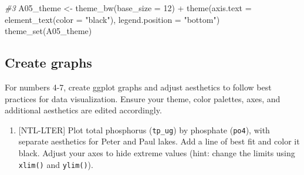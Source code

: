\documentclass[
]{article}
\newenvironment{Shaded}{\begin{snugshade}}{\end{snugshade}}
\newcommand{\AttributeTok}[1]{\textcolor[rgb]{0.77,0.63,0.00}{#1}}
\newcommand{\CommentTok}[1]{\textcolor[rgb]{0.56,0.35,0.01}{\textit{#1}}}
\newcommand{\DecValTok}[1]{\textcolor[rgb]{0.00,0.00,0.81}{#1}}
\newcommand{\FunctionTok}[1]{\textcolor[rgb]{0.00,0.00,0.00}{#1}}
\newcommand{\NormalTok}[1]{#1}
\newcommand{\OtherTok}[1]{\textcolor[rgb]{0.56,0.35,0.01}{#1}}
\newcommand{\SpecialCharTok}[1]{\textcolor[rgb]{0.00,0.00,0.00}{#1}}
\newcommand{\StringTok}[1]{\textcolor[rgb]{0.31,0.60,0.02}{#1}}
\providecommand{\tightlist}{%
  \setlength{\itemsep}{0pt}\setlength{\parskip}{0pt}}
\begin{document}
\begin{Shaded}
\begin{Highlighting}[]
\CommentTok{\#3}
\NormalTok{A05\_theme }\OtherTok{\textless{}{-}} \FunctionTok{theme\_bw}\NormalTok{(}\AttributeTok{base\_size =} \DecValTok{12}\NormalTok{) }\SpecialCharTok{+}
  \FunctionTok{theme}\NormalTok{(}\AttributeTok{axis.text =} \FunctionTok{element\_text}\NormalTok{(}\AttributeTok{color =} \StringTok{"black"}\NormalTok{), }\AttributeTok{legend.position =} \StringTok{"bottom"}\NormalTok{)}
\FunctionTok{theme\_set}\NormalTok{(A05\_theme)}
\end{Highlighting}
\end{Shaded}

\hypertarget{create-graphs}{%
\subsection{Create graphs}\label{create-graphs}}

For numbers 4-7, create ggplot graphs and adjust aesthetics to follow
best practices for data visualization. Ensure your theme, color
palettes, axes, and additional aesthetics are edited accordingly.

\begin{enumerate}
\def\labelenumi{\arabic{enumi}.}
\setcounter{enumi}{3}
\tightlist
\item
  {[}NTL-LTER{]} Plot total phosphorus (\texttt{tp\_ug}) by phosphate
  (\texttt{po4}), with separate aesthetics for Peter and Paul lakes. Add
  a line of best fit and color it black. Adjust your axes to hide
  extreme values (hint: change the limits using \texttt{xlim()} and
  \texttt{ylim()}).
\end{enumerate}
\end{document}
